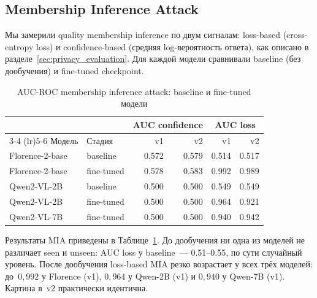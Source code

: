 \documentclass[a4paper,12pt]{extarticle}
\begin{document}
\subsection{Membership Inference Attack}
\label{sec:results_mia}

Мы замерили quality membership inference по двум сигналам: loss-based (cross-entropy loss) и confidence-based (средняя log-вероятность ответа), как описано в разделе~\ref{sec:privacy_evaluation}. Для каждой модели сравнивали baseline (без дообучения) и fine-tuned checkpoint.


\begin{table}[ht]
	\caption{AUC-ROC membership inference attack: baseline и fine-tuned модели}
	\label{table:mia_results}
	\footnotesize
	\centering
	\begin{tabular}{llrrrr}
		\toprule
		& & \multicolumn{2}{c}{AUC confidence} & \multicolumn{2}{c}{AUC loss} \\
		\cmidrule(lr){3-4} \cmidrule(lr){5-6}
		Модель & Стадия & v1 & v2 & v1 & v2 \\
		\midrule
		Florence-2-base & baseline   & 0.572 & 0.579 & 0.514 & 0.517 \\
		Florence-2-base & fine-tuned & 0.578 & 0.583 & 0.992 & 0.989 \\
		\midrule
		Qwen2-VL-2B    & baseline   & 0.500 & 0.500 & 0.549 & 0.549 \\
		Qwen2-VL-2B    & fine-tuned & 0.500 & 0.500 & 0.964 & 0.921 \\
		\midrule
		Qwen2-VL-7B    & fine-tuned & 0.500 & 0.500 & 0.940 & 0.942 \\
		\bottomrule
	\end{tabular}
\end{table}

Результаты MIA приведены в Таблице~\ref{table:mia_results}. До дообучения ни одна из моделей не различает seen и unseen: AUC loss у baseline~--- 0.51--0.55, по сути случайный уровень. После дообучения loss-based MIA резко возрастает у всех трёх моделей: до~$0{,}992$ у Florence (v1), $0{,}964$ у Qwen-2B (v1) и $0{,}940$ у Qwen-7B (v1). Картина в~v2 практически идентична.
\end{document}
